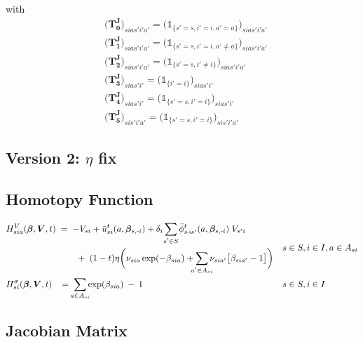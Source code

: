 \documentclass[11pt,fleqn]{article}
\newcommand{\bbeta}{\bm{\beta}}
\newcommand{\bV}{\bm{V}}
\newcommand{\id}{\mathds{1}}
\newcommand{\shortminus}{{\text{\scalebox{0.4}[1.0]{\(-\)}}}}
\newcommand{\minusi}{\shortminus i}
\newcommand{\shortrightarrow}{\parbox{4pt}{\tikz{\draw[->](0,0)--(4pt,0);}}}
\newcommand{\barphiss}{\bar{\phi}_{s\shortrightarrow s'}}
\begin{document}
with
\begin{align*}
	& \biggl( \bm{T_0^J} \biggr)_{sias'i'a'} = \biggl( \id_{\{s'=s,i'=i,a'=a\}} \biggr)_{sias'i'a'} \\
	& \biggl( \bm{T_1^J} \biggr)_{sias'i'a'} = \biggl( \id_{\{s'=s,i'=i,a'\neq a\}} \biggr)_{sias'i'a'} \\
	& \biggl( \bm{T_2^J} \biggr)_{sias'i'a'} = \biggl( \id_{\{s'=s,i'\neq i\}} \biggr)_{sias'i'a'} \\
	& \biggl( \bm{T_3^J} \biggr)_{sias'i'} = \biggl( \id_{\{i'=i\}} \biggr)_{sias'i'} \\
	& \biggl( \bm{T_4^J} \biggr)_{sias'i'} = \biggl( \id_{\{s'=s,i'=i\}} \biggr)_{sias'i'} \\
	& \biggl( \bm{T_5^J} \biggr)_{sis'i'a'} = \biggl( \id_{\{s'=s,i'=i\}} \biggr)_{sis'i'a'}
\end{align*}




\subsection{Version 2: $\eta$ fix}


\subsection*{Homotopy Function}

\begin{align*}
	& \begin{aligned}
		H^V_{sia}(\bbeta,\bV,t) & \;=\; - V_{si} + \bar{u}_{si}^t(a,\bbeta_{s,\minusi}) + \delta_i \sum\limits_{\mathclap{s'\in S}} \barphiss^t(a,\bbeta_{s,\minusi}) \; V_{s'i} \\
		& \qquad \;+\; (1-t)\eta \biggl( \nu_{sia} \exp(-\beta_{sia}) + \sum\limits_{\mathclap{a'\in A_{si}}} \nu_{sia'} \bigl[ \beta_{sia'} - 1 \bigr] \biggr)
	\end{aligned} && s\in S, i\in I, a\in A_{si} \\
	& H^\sigma_{si}(\bbeta,\bV,t) \;\; \;=\; \sum\limits_{\mathclap{a\in A_{si}}} \exp(\beta_{sia}) \:-\: 1 && s\in S, i\in I
\end{align*}


\subsection*{Jacobian Matrix}
\end{document}
